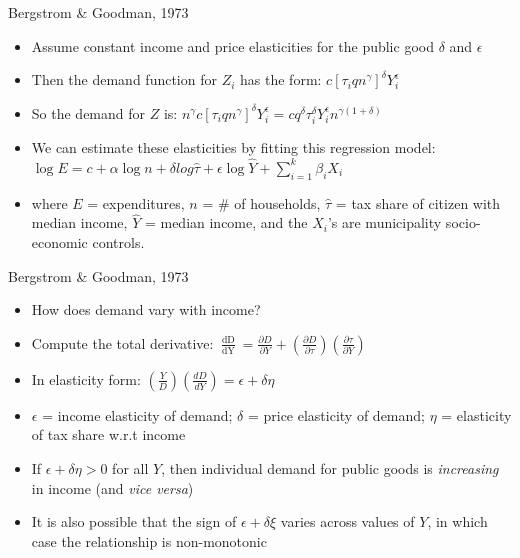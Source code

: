 \documentclass[aspectratio=169]{beamer}
\begin{document}
\begin{frame}{Bergstrom \& Goodman, 1973}

\begin{itemize}
\item Assume constant income and price elasticities for the public good $\delta$ and $\epsilon$
\pause
\item Then the demand function for $Z_i$ has the form: $c[ \tau_i q n^\gamma ]^\delta Y_i^\epsilon$
\pause
\item So the demand for $Z$ is: $n^\gamma c[ \tau_i q n^\gamma ]^\delta Y_i^\epsilon = c q^\delta \tau_i^\delta Y_i^\epsilon n^{\gamma (1 + \delta)}$
\pause
\item We can estimate these elasticities by fitting this regression model: $ \log E = c + \alpha \log n + \delta log \hat{\tau} + \epsilon \log \hat{Y} + \sum_{i=1}^k \beta_i X_i$
\pause
\item where $E$ = expenditures, $n$ = \# of households, $\hat{\tau}$ = tax share of citizen with median income, $\hat{Y} $ = median income, and the $X_i$'s are municipality socio-economic controls.

\end{itemize}


\end{frame}
\begin{frame}{Bergstrom \& Goodman, 1973}

\begin{itemize}
\item How does demand vary with income?
\pause
\item Compute the total derivative: $ \frac{\mathop{dD}}{\mathop{dY}} = \frac{ \partial D}{ \partial Y } + \left( \frac{ \partial D }{ \partial \tau} \right) \left( \frac{ \partial \tau}{ \partial Y} \right) $
\pause 
\item In elasticity form: $ \left( \frac{Y}{D} \right) \left( \frac{ d D}{d Y } \right) = \epsilon + \delta \eta$
\pause 
\item $\epsilon$ = income elasticity of demand; $\delta$ = price elasticity of demand; $\eta$ = elasticity of tax share w.r.t income
\pause 
\item If $\epsilon + \delta \eta > 0$ for all $Y$, then individual demand for public goods is \textit{increasing} in income (and \textit{vice versa})
\pause 
\item It is also possible that the sign of $\epsilon + \delta \xi$ varies across values of $Y$, in which case the relationship is non-monotonic

\end{itemize}


\end{frame}
\end{document}
